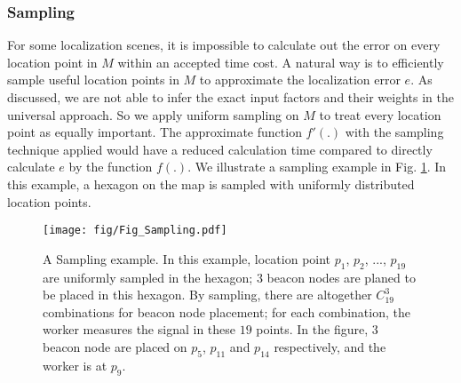 \documentclass[10pt, conference, letterpaper]{IEEEtran}
\begin{document}
\subsubsection{Sampling}
For some localization scenes, it is impossible to calculate out the error on every location point in $M$ within an accepted time cost. A natural way is to efficiently sample useful location points in $M$ to approximate the localization error $e$. As discussed, we are not able to infer the exact input factors and their weights in the universal approach. So we apply uniform sampling on $M$ to treat every location point as equally important. The approximate function $f'(.)$ with the sampling technique applied would have a reduced calculation time compared to directly calculate $e$ by the function $f(.)$. We illustrate a sampling example in Fig. \ref{Fig_Sampling}. In this example, a hexagon on the map is sampled with uniformly distributed location points.
\begin{figure}
\centering
\texttt{[image: fig/Fig\_Sampling.pdf]}\\
\caption{\textrm{A Sampling example. In this example, location point $p_1$, $p_2$, ..., $p_{19}$ are uniformly sampled in the hexagon; $3$ beacon nodes are planed to be placed in this hexagon. By sampling, there are altogether $C_{19}^3$ combinations for beacon node placement; for each combination, the worker measures the signal in these $19$ points. In the figure, $3$ beacon node are placed on $p_5$, $p_{11}$ and $p_{14}$ respectively, and the worker is at $p_9$.}} \label{Fig_Sampling}
\end{figure}
\end{document}
